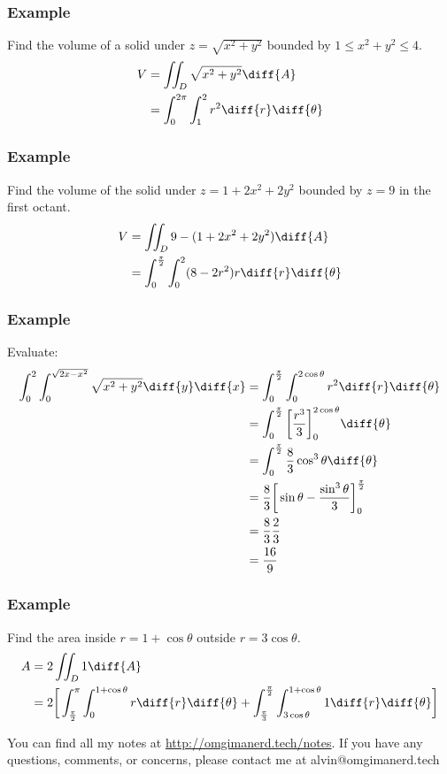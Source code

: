 \documentclass[letterpaper, 12pt]{math}
\begin{document}
\subsubsection*{Example}
Find the volume of a solid under \( z = \sqrt{x^2+y^2} \) bounded by
\( 1\le x^2+y^2\le 4 \).
\begin{align*}
  V &= \iint_{D}\sqrt{x^2+y^2}\diff{A} \\
  &= \int_{0}^{2\pi}\int_{1}^{2}r^2\diff{r}\diff{\theta} \\
\end{align*}

\subsubsection*{Example}
Find the volume of the solid under \( z = 1+2x^2+2y^2 \) bounded by
\( z = 9 \) in the first octant.
\begin{align*}
  V &= \iint_{D}9-(1+2x^2+2y^2)\diff{A} \\
  &= \int_{0}^{\frac{\pi}{2}}\int_{0}^{2}(8-2r^2)r\diff{r}\diff{\theta}
\end{align*}

\subsubsection*{Example}
Evaluate:
\begin{align*}
  \int_{0}^{2}\int_{0}^{\sqrt{2x-x^2}}\sqrt{x^2+y^2}\diff{y}\diff{x}
  &= \int_{0}^{\frac{\pi}{2}}\int_{0}^{2\cos\theta}r^2\diff{r}\diff{\theta} \\
  &= \int_{0}^{\frac{\pi}{2}}
    \bigg[\frac{r^3}{3}\bigg]_{0}^{2\cos\theta}\diff{\theta} \\
  &= \int_{0}^{\frac{\pi}{2}}\frac{8}{3}\cos^3\theta\diff{\theta} \\
  &= \frac{8}{3}
    \bigg[\sin\theta-\frac{\sin^3\theta}{3}\bigg]_{0}^{\frac{\pi}{2}} \\
  &= \frac{8}{3}\frac{2}{3} \\
  &= \frac{16}{9}
\end{align*}

\subsubsection*{Example}
Find the area inside \( r = 1+\cos\theta \) outside \( r = 3\cos\theta \).
\begin{align*}
  A &= 2\iint_{D}1\diff{A} \\
  &= 2\bigg[
    \int_{\frac{\pi}{2}}^{\pi}\int_{0}^{1+\cos\theta}r\diff{r}\diff{\theta}+
    \int_{\frac{\pi}{3}}^{\frac{\pi}{2}}
      \int_{3\cos\theta}^{1+\cos\theta}1\diff{r}\diff{\theta}
    \bigg]
\end{align*}

\begin{center}
  You can find all my notes at \url{http://omgimanerd.tech/notes}. If you have
  any questions, comments, or concerns, please contact me at
  alvin@omgimanerd.tech
\end{center}
\end{document}
